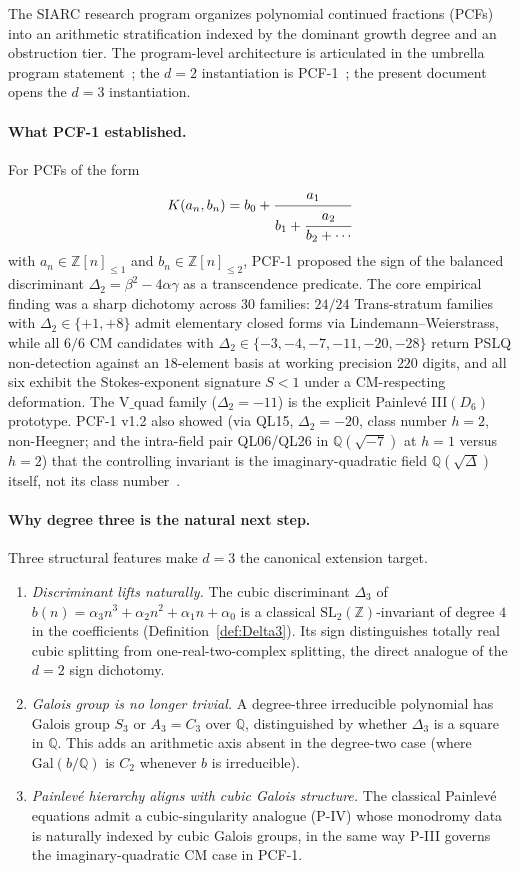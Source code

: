 \documentclass[11pt,a4paper]{article}
\theoremstyle{definition}
\theoremstyle{remark}
\newcommand{\Q}{\mathbb{Q}}
\newcommand{\Z}{\mathbb{Z}}
\newcommand{\Gal}{\mathrm{Gal}}
\begin{document}
The SIARC research program organizes polynomial continued fractions (PCFs)
into an arithmetic stratification indexed by the dominant growth degree
and an obstruction tier. The program-level architecture is articulated in
the umbrella program statement~\cite{Papanokechi2026UMB}; the
$d=2$ instantiation is PCF-1~\cite{Papanokechi2026PCF1}; the present
document opens the $d=3$ instantiation.

\paragraph{What PCF-1 established.}
For PCFs of the form
\[
K(a_{n},b_{n})=b_{0}+\cfrac{a_{1}}{b_{1}+\cfrac{a_{2}}{b_{2}+\cdots}}
\]
with $a_{n}\in\Z[n]_{\le 1}$ and $b_{n}\in\Z[n]_{\le 2}$, PCF-1
proposed the sign of the balanced discriminant
$\Delta_{2}=\beta^{2}-4\alpha\gamma$ as a transcendence predicate. The
core empirical finding was a sharp dichotomy across $30$ families: $24/24$
Trans-stratum families with $\Delta_{2}\in\{+1,+8\}$ admit elementary
closed forms via Lindemann--Weierstrass, while all $6/6$ CM candidates
with $\Delta_{2}\in\{-3,-4,-7,-11,-20,-28\}$ return PSLQ non-detection
against an $18$-element basis at working precision $220$ digits, and all
six exhibit the Stokes-exponent signature $S<1$ under a CM-respecting
deformation. The V$\_$quad family ($\Delta_{2}=-11$) is the explicit
Painlev\'e III$(D_{6})$ prototype. PCF-1 v1.2 also showed (via QL15,
$\Delta_{2}=-20$, class number $h=2$, non-Heegner; and the intra-field
pair QL06/QL26 in $\Q(\sqrt{-7})$ at $h=1$ versus $h=2$) that the
controlling invariant is the imaginary-quadratic field $\Q(\sqrt{\Delta})$
itself, not its class number~\cite{Papanokechi2026PCF1}.

\paragraph{Why degree three is the natural next step.}
Three structural features make $d=3$ the canonical extension target.

\begin{enumerate}
\item \emph{Discriminant lifts naturally.} The cubic discriminant
$\Delta_{3}$ of $b(n)=\alpha_{3}n^{3}+\alpha_{2}n^{2}+\alpha_{1}n+\alpha_{0}$
is a classical $\mathrm{SL}_{2}(\Z)$-invariant of degree $4$ in the
coefficients (Definition~\ref{def:Delta3}). Its sign distinguishes
totally real cubic splitting from one-real-two-complex splitting, the
direct analogue of the $d=2$ sign dichotomy.
\item \emph{Galois group is no longer trivial.} A degree-three irreducible
polynomial has Galois group $S_{3}$ or $A_{3}=C_{3}$ over $\Q$,
distinguished by whether $\Delta_{3}$ is a square in $\Q$. This adds an
arithmetic axis absent in the degree-two case (where $\Gal(b/\Q)$ is
$C_{2}$ whenever $b$ is irreducible).
\item \emph{Painlev\'e hierarchy aligns with cubic Galois structure.} The
classical Painlev\'e equations admit a cubic-singularity analogue (P-IV)
whose monodromy data is naturally indexed by cubic Galois groups, in
the same way P-III governs the imaginary-quadratic CM case in PCF-1.
\end{enumerate}
\end{document}
